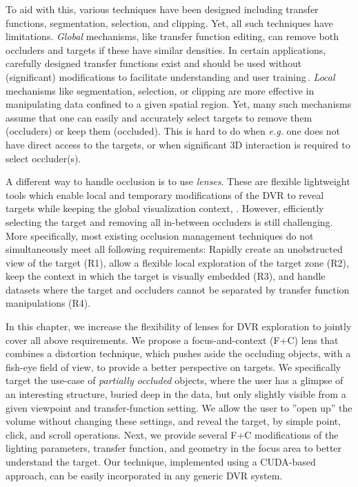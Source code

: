 To aid with this, various techniques have been designed including transfer functions, segmentation, selection, and clipping. Yet, all such techniques have limitations.  \emph{Global} mechanisms, like transfer function editing, can remove both occluders and targets if these have similar densities. In certain applications, carefully designed transfer functions exist and should be used without (significant) modifications to facilitate understanding and user training\,\cite{4276082}. \emph{Local} mechanisms like segmentation, selection, or clipping are more effective in manipulating data confined to a given spatial region. Yet, many such mechanisms assume that one can easily and accurately select targets to remove them (occluders) or keep them (occluded). This is hard to do when \emph{e.g.} one does not have direct access to the targets, or when significant 3D interaction is required to select occluder(s).

A different way to handle occlusion is to use \emph{lenses}. These are flexible lightweight tools which enable local and temporary modifications of the DVR to reveal targets while keeping the global visualization context, \cite{595268,CGF:CGF12871,6327262}. However, efficiently selecting the target and  removing all in-between occluders is still challenging. More specifically, most existing occlusion management techniques do not simultaneously meet all following requirements: Rapidly create an unobstructed view of the target (R1), allow a flexible local exploration of the target zone (R2), keep the context in which the target is visually embedded (R3), and handle datasets where the target and occluders cannot 
be separated by transfer function manipulations (R4).

In this chapter, we increase the flexibility of lenses for DVR exploration to jointly cover all above requirements. We propose a focus-and-context (F+C) lens that combines a distortion technique, which pushes aside the occluding objects, with a fish-eye field of view, to provide a better perspective on targets. We specifically target the use-case of \emph{partially occluded} objects, where the user has a glimpse of an interesting structure, buried deep in the data, but only slightly visible from a given viewpoint and transfer-function setting. We allow the user to ''open up'' the volume without changing these settings, and reveal the target, by simple point, click, and scroll operations. Next, we provide several F+C modifications of the lighting parameters, transfer function, and geometry in the focus area to better understand the target. Our technique, implemented using a CUDA-based approach, can be easily incorporated in any generic DVR system.

